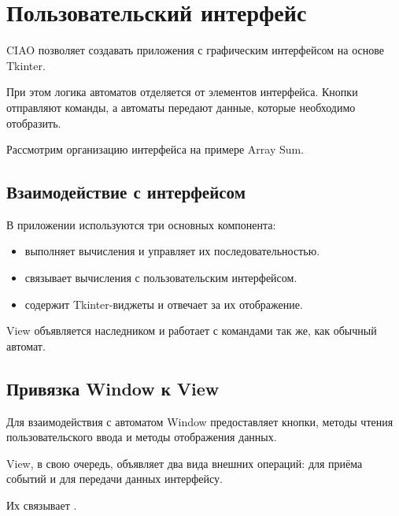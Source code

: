 
\chapter{Пользовательский интерфейс}
\label{chap:user-interface}

CIAO позволяет создавать приложения с графическим
интерфейсом на основе Tkinter.

При этом логика автоматов отделяется от элементов
интерфейса. Кнопки отправляют команды, а автоматы
передают данные, которые необходимо отобразить.

Рассмотрим организацию интерфейса на примере
Array Sum.

\section{Взаимодействие с интерфейсом}

В приложении используются три основных компонента:

\begin{itemize}
  \item {} выполняет вычисления
    и управляет их последовательностью.
  \item {} связывает вычисления
    с пользовательским интерфейсом.
  \item {} содержит Tkinter-виджеты
    и отвечает за их отображение.
\end{itemize}

View объявляется наследником 
и работает с командами так же, как обычный автомат.

\section{Привязка Window к View}

Для взаимодействия с автоматом Window предоставляет
кнопки, методы чтения пользовательского ввода и
методы отображения данных.

View, в свою очередь, объявляет два вида внешних операций:
 для приёма событий и 
для передачи данных интерфейсу.

Их связывает .

